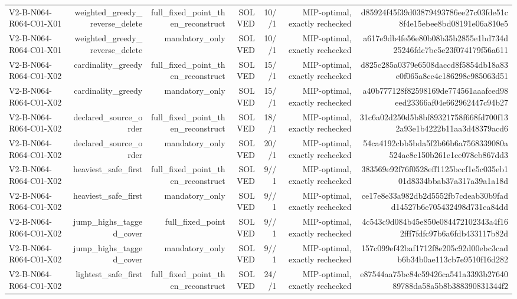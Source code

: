 {\begin{longtable}{lrrrrrr}
V2-B-N064-R064-C01-X01 & weighted\_greedy\_reverse\_delete & full\_fixed\_point\_then\_reconstruct & SOLVED & 10//1 & MIP-optimal, exactly rechecked & d85924f45f39d03879493786ee27c03fde51c8f4e15ebee8bd08191e06a810e5 \\
V2-B-N064-R064-C01-X01 & weighted\_greedy\_reverse\_delete & mandatory\_only & SOLVED & 10//1 & MIP-optimal, exactly rechecked & a617e9db4fe56e80b08b35b2855e1bd734d25246fdc7bc5e23f074179f56a611 \\
V2-B-N064-R064-C01-X02 & cardinality\_greedy & full\_fixed\_point\_then\_reconstruct & SOLVED & 15//1 & MIP-optimal, exactly rechecked & d825c285a0379e6508daccd8f5854db18a83e0f065a8ce4c186298c985063d51 \\
V2-B-N064-R064-C01-X02 & cardinality\_greedy & mandatory\_only & SOLVED & 15//1 & MIP-optimal, exactly rechecked & a40b777128f82598169de774561aaafced98eed23366af04e662962447c94b27 \\
V2-B-N064-R064-C01-X02 & declared\_source\_order & full\_fixed\_point\_then\_reconstruct & SOLVED & 18//1 & MIP-optimal, exactly rechecked & 31c6a02d250d5b8bf89321758f668fd700f132a93e1b4222b11aa3d48379acd6 \\
V2-B-N064-R064-C01-X02 & declared\_source\_order & mandatory\_only & SOLVED & 20//1 & MIP-optimal, exactly rechecked & 54ca4192cbb5bda5f2b66b6a7568339080a524ac8c150b261e1ce078eb867dd3 \\
V2-B-N064-R064-C01-X02 & heaviest\_safe\_first & full\_fixed\_point\_then\_reconstruct & SOLVED & 9//1 & MIP-optimal, exactly rechecked & 383569e92f76f0528eff1125bccf1e5c035eb101d8334bbab37a317a39a1a18d \\
V2-B-N064-R064-C01-X02 & heaviest\_safe\_first & mandatory\_only & SOLVED & 9//1 & MIP-optimal, exactly rechecked & ce17e8e33a982db2d5552fb7cdeab30b9fadd14527b6e705432498d731ea84dd \\
V2-B-N064-R064-C01-X02 & jump\_highs\_tagged\_cover & full\_fixed\_point & SOLVED & 9//1 & MIP-optimal, exactly rechecked & 4c543c9d084b45e850e084472102343a4f162fff7fdfc97b6a6fdb433117b82d \\
V2-B-N064-R064-C01-X02 & jump\_highs\_tagged\_cover & mandatory\_only & SOLVED & 9//1 & MIP-optimal, exactly rechecked & 157c099ef42baf1712f8e205c92d00ebc3cadb6b34b0ae113cb7e9510f16d282 \\
V2-B-N064-R064-C01-X02 & lightest\_safe\_first & full\_fixed\_point\_then\_reconstruct & SOLVED & 24//1 & MIP-optimal, exactly rechecked & e87544aa75bc84c59426ca541a3393b2764089788da58a5b8b388390831344f2 \\

\end{longtable}}
